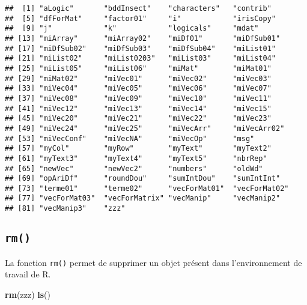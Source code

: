 \documentclass[]{book}
\newenvironment{Shaded}{\begin{snugshade}}{\end{snugshade}}
\newcommand{\KeywordTok}[1]{\textcolor[rgb]{0.13,0.29,0.53}{\textbf{#1}}}
\newcommand{\NormalTok}[1]{#1}
\theoremstyle{definition}
\theoremstyle{definition}
\theoremstyle{definition}
\theoremstyle{remark}
\begin{document}
\begin{verbatim}
##  [1] "aLogic"       "bddInsect"    "characters"   "contrib"     
##  [5] "dfForMat"     "factor01"     "i"            "irisCopy"    
##  [9] "j"            "k"            "logicals"     "mdat"        
## [13] "miArray"      "miArray02"    "miDf01"       "miDfSub01"   
## [17] "miDfSub02"    "miDfSub03"    "miDfSub04"    "miList01"    
## [21] "miList02"     "miList0203"   "miList03"     "miList04"    
## [25] "miList05"     "miList06"     "miMat"        "miMat01"     
## [29] "miMat02"      "miVec01"      "miVec02"      "miVec03"     
## [33] "miVec04"      "miVec05"      "miVec06"      "miVec07"     
## [37] "miVec08"      "miVec09"      "miVec10"      "miVec11"     
## [41] "miVec12"      "miVec13"      "miVec14"      "miVec15"     
## [45] "miVec20"      "miVec21"      "miVec22"      "miVec23"     
## [49] "miVec24"      "miVec25"      "miVecArr"     "miVecArr02"  
## [53] "miVecConf"    "miVecNA"      "miVecOp"      "msg"         
## [57] "myCol"        "myRow"        "myText"       "myText2"     
## [61] "myText3"      "myText4"      "myText5"      "nbrRep"      
## [65] "newVec"       "newVec2"      "numbers"      "oldWd"       
## [69] "opAriDf"      "roundDou"     "sumIntDou"    "sumIntInt"   
## [73] "terme01"      "terme02"      "vecForMat01"  "vecForMat02" 
## [77] "vecForMat03"  "vecForMatrix" "vecManip"     "vecManip2"   
## [81] "vecManip3"    "zzz"
\end{verbatim}

\subsection{\texorpdfstring{\texttt{rm()}}{rm()}}\label{l015rm}

La fonction \texttt{rm()} permet de supprimer un objet présent dans
l'environnement de travail de R.

\begin{Shaded}
\begin{Highlighting}[]
\KeywordTok{rm}\NormalTok{(zzz)}
\KeywordTok{ls}\NormalTok{()}
\end{Highlighting}
\end{Shaded}
\end{document}
